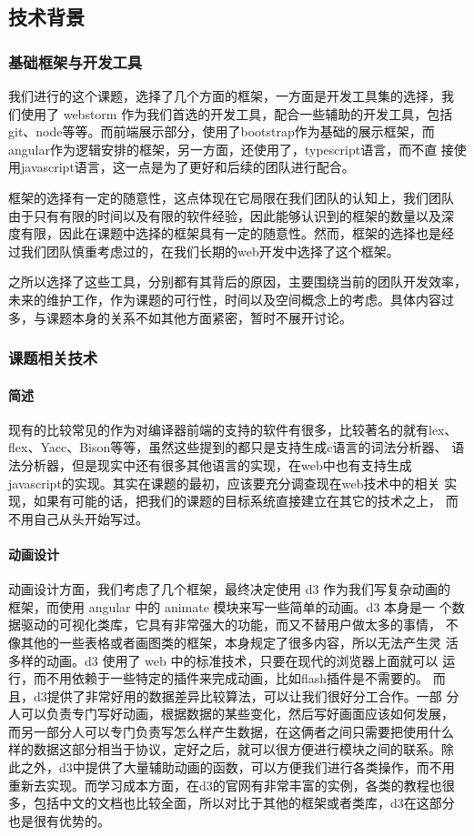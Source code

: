\subsection{技术背景}
\subsubsection{基础框架与开发工具}
我们进行的这个课题，选择了几个方面的框架，一方面是开发工具集的选择，我
们使用了 webstorm 作为我们首选的开发工具，配合一些辅助的开发工具，包括
git、node等等。而前端展示部分，使用了bootstrap作为基础的展示框架，而
angular作为逻辑安排的框架，另一方面，还使用了，typescript语言，而不直
接使用javascript语言，这一点是为了更好和后续的团队进行配合。

框架的选择有一定的随意性，这点体现在它局限在我们团队的认知上，我们团队
由于只有有限的时间以及有限的软件经验，因此能够认识到的框架的数量以及深
度有限，因此在课题中选择的框架具有一定的随意性。然而，框架的选择也是经
过我们团队慎重考虑过的，在我们长期的web开发中选择了这个框架。

之所以选择了这些工具，分别都有其背后的原因，主要围绕当前的团队开发效率，
未来的维护工作，作为课题的可行性，时间以及空间概念上的考虑。具体内容过
多，与课题本身的关系不如其他方面紧密，暂时不展开讨论。
\subsubsection{课题相关技术}
\paragraph{简述} 
现有的比较常见的作为对编译器前端的支持的软件有很多，比较著名的就有lex、
flex、Yacc、Bison等等，虽然这些提到的都只是支持生成c语言的词法分析器、
语法分析器，但是现实中还有很多其他语言的实现，在web中也有支持生成
javascript的实现。其实在课题的最初，应该要充分调查现在web技术中的相关
实现，如果有可能的话，把我们的课题的目标系统直接建立在其它的技术之上，
而不用自己从头开始写过。
\paragraph{动画设计}
动画设计方面，我们考虑了几个框架，最终决定使用 d3 作为我们写复杂动画的
框架，而使用 angular 中的 animate 模块来写一些简单的动画。d3 本身是一
个数据驱动的可视化类库，它具有非常强大的功能，而又不替用户做太多的事情，
不像其他的一些表格或者画图类的框架，本身规定了很多内容，所以无法产生灵
活多样的动画。d3 使用了 web 中的标准技术，只要在现代的浏览器上面就可以
运行，而不用依赖于一些特定的插件来完成动画，比如flash插件是不需要的。
而且，d3提供了非常好用的数据差异比较算法，可以让我们很好分工合作。一部
分人可以负责专门写好动画，根据数据的某些变化，然后写好画面应该如何发展，
而另一部分人可以专门负责写怎么样产生数据，在这俩者之间只需要把使用什么
样的数据这部分相当于协议，定好之后，就可以很方便进行模块之间的联系。除
此之外，d3中提供了大量辅助动画的函数，可以方便我们进行各类操作，而不用
重新去实现。而学习成本方面，在d3的官网有非常丰富的实例，各类的教程也很
多，包括中文的文档也比较全面，所以对比于其他的框架或者类库，d3在这部分
也是很有优势的。
